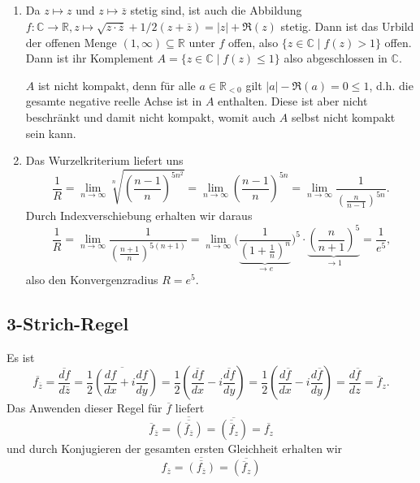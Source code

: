 \documentclass[a4paper]{article}
\begin{document}
\subsection{}

\begin{enumerate}
	\item Da $z \mapsto z$ und $z \mapsto \overline{z}$ stetig sind, ist auch die Abbildung $f: \mathds{C} \to \mathds{R}, z \mapsto \sqrt{z \cdot \overline{z}} + 1/2 (z + \overline{z}) = |z| + \Re(z)$ stetig. Dann ist das Urbild der offenen Menge $(1, \infty) \subseteq \mathds{R}$ unter $f$ offen, also $\{z \in \mathds{C} \mid f(z) > 1\}$ offen. Dann ist ihr Komplement $A = \{z \in \mathds{C} \mid f(z) \leq 1\}$ also abgeschlossen in $\mathds{C}$.
	
	$A$ ist nicht kompakt, denn für alle $a \in \mathds{R}_{<0}$ gilt $|a| - \Re(a) = 0 \leq 1$, d.h. die gesamte negative reelle Achse ist in $A$ enthalten. Diese ist aber nicht beschränkt und damit nicht kompakt, womit auch $A$ selbst nicht kompakt sein kann.
	\item Das Wurzelkriterium liefert uns
	\begin{equation*}
	\frac{1}{R} = \lim_{n \to \infty} \sqrt[n]{\left(\frac{n-1}{n}\right)^{5n^2}} = \lim_{n \to \infty} \left(\frac{n-1}{n}\right)^{5n} = \lim_{n \to \infty} \frac{1}{\left(\frac{n}{n-1}\right)^{5n}}\text{.}
	\end{equation*}
	Durch Indexverschiebung erhalten wir daraus
	\begin{equation*}
		\frac{1}{R} = \lim_{n \to \infty} \frac{1}{\left(\frac{n+1}{n}\right)^{5(n+1)}} =  \lim_{n \to \infty} \Bigg( \frac{1}{ \underbrace{\left( 1 + \frac{1}{n} \right)^n }_{\to e} } \Bigg)^5 \cdot \underbrace{\left(\frac{n}{n+1}\right)^5}_{\to 1} = \frac{1}{e^5}\text{,}
	\end{equation*}
	also den Konvergenzradius $R = e^5$.
\end{enumerate}

\subsection{3-Strich-Regel}

Es ist 
\begin{equation*}
	\overline{f_{\overline{z}}} = \overline{\frac{df}{d\overline{z}}} = \overline{\frac
	{1}{2} \left( \frac{df}{dx} + i \frac{df}{dy} \right)} = \frac{1}{2} \left(\overline{\frac{df}{dx}}- i \overline{\frac{df}{dy}}\right) = \frac{1}{2} \left(\frac{d\overline{f}}{dx} - i \frac{d\overline{f}}{dy}\right) = \frac{d \overline{f}}{dz} = \overline{f}_{z}\text{.}
\end{equation*}
Das Anwenden dieser Regel für $\overline{f}$ liefert
\begin{equation*}
	\overline{f}_{\overline{z}} = \overline{\overline{(\overline{f}_{\overline{z}})}} = \overline{(\overline{\overline{f}}_{z})} = \overline{f_z}
\end{equation*}
und durch Konjugieren der gesamten ersten Gleichheit erhalten wir
\begin{equation*}
	f_{\overline{z}} = \overline{\overline{(f_{\overline{z}})}} = \overline{(\overline{f}_{z})}
\end{equation*}
\end{document}
